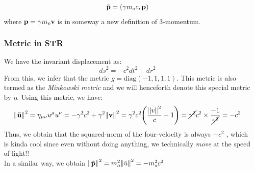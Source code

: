 \begin{itemize}
    $$\vb{\bar{p}} = \qty(\gamma m_o c, \vb{{p}})$$ where $\vb{{p}} = \gamma m_o \vb{{v}}$ is in someway a new definition of 3-momentum. 
\end{itemize}

\subsubsection{Metric in STR}\label{sec:aa}
We have the invariant displacement as:
$$ds^2 = -c^2dt^2+dr^2$$
From this, we infer that the metric $g = \mathrm{diag}(-1,1,1,1)$. This metric is also termed as the \textit{Minkowski metric} and we will henceforth denote this special metric by $\eta$. Using this metric, we have:
$$\norm{\vb{\bar{u}}}^2 = \eta_{\mu\nu}u^\mu u^\nu = -\gamma^2c^2 + \gamma^2 \norm{\vb{v}}^2 = \gamma^2c^2\qty(\frac{\norm{v}^2}{c}-1) = \cancel{\gamma^2} c^2\times \frac{-1}{\cancel{\gamma^2}}=-c^2$$
Thus, we obtain that the squared-norm of the four-velocity is always $-c^2$ , which is kinda cool since even without doing anything, we technically \textit{move} at the speed of light!!\\[0.2cm]
In a similar way, we obtain $\norm{\vb{\bar{p}}}^2 = m_o^2 \norm{\bar{u}}^2 = -m_o^2c^2 $